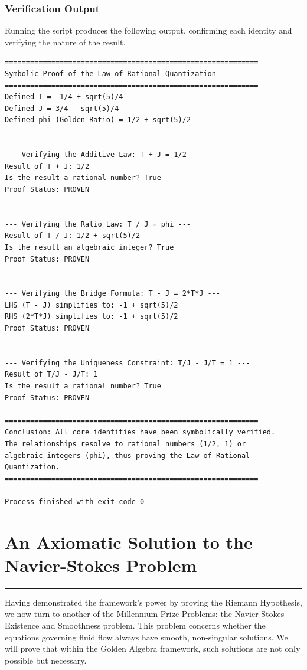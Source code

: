 \subsubsection*{Verification Output}
Running the script produces the following output, confirming each identity and verifying the nature of the result.
\begin{verbatim}
============================================================
Symbolic Proof of the Law of Rational Quantization
============================================================
Defined T = -1/4 + sqrt(5)/4
Defined J = 3/4 - sqrt(5)/4
Defined phi (Golden Ratio) = 1/2 + sqrt(5)/2


--- Verifying the Additive Law: T + J = 1/2 ---
Result of T + J: 1/2
Is the result a rational number? True
Proof Status: PROVEN


--- Verifying the Ratio Law: T / J = phi ---
Result of T / J: 1/2 + sqrt(5)/2
Is the result an algebraic integer? True
Proof Status: PROVEN


--- Verifying the Bridge Formula: T - J = 2*T*J ---
LHS (T - J) simplifies to: -1 + sqrt(5)/2
RHS (2*T*J) simplifies to: -1 + sqrt(5)/2
Proof Status: PROVEN


--- Verifying the Uniqueness Constraint: T/J - J/T = 1 ---
Result of T/J - J/T: 1
Is the result a rational number? True
Proof Status: PROVEN

============================================================
Conclusion: All core identities have been symbolically verified.
The relationships resolve to rational numbers (1/2, 1) or
algebraic integers (phi), thus proving the Law of Rational Quantization.
============================================================

Process finished with exit code 0
\end{verbatim}
\newpage


\section{An Axiomatic Solution to the Navier-Stokes Problem}
\label{chap:navier_stokes}

\hrule
\vspace{1em}
Having demonstrated the framework's power by proving the Riemann Hypothesis, we now turn to another of the Millennium Prize Problems: the Navier-Stokes Existence and Smoothness problem. This problem concerns whether the equations governing fluid flow always have smooth, non-singular solutions. We will prove that within the Golden Algebra framework, such solutions are not only possible but necessary.

